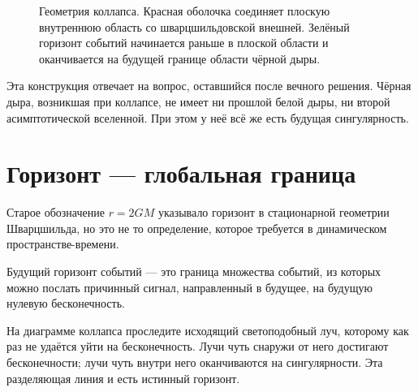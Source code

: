 \begin{figure}[htbp]
\centering
{}
\caption{Геометрия коллапса. Красная оболочка соединяет плоскую внутреннюю область со шварцшильдовской внешней. Зелёный горизонт событий начинается раньше в плоской области и оканчивается на будущей границе области чёрной дыры.}
\label{fig:l05-collapse}
\end{figure}

Эта конструкция отвечает на вопрос, оставшийся после вечного решения. Чёрная дыра, возникшая при коллапсе, не имеет ни прошлой белой дыры, ни второй асимптотической вселенной. При этом у неё всё же есть будущая сингулярность.

\section{Горизонт — глобальная граница}

Старое обозначение \(r=2GM\) указывало горизонт в стационарной геометрии Шварцшильда, но это не то определение, которое требуется в динамическом пространстве-времени.

\begin{definition}
Будущий горизонт событий — это граница множества событий, из которых можно послать причинный сигнал, направленный в будущее, на будущую нулевую бесконечность.
\end{definition}

На диаграмме коллапса проследите исходящий светоподобный луч, которому как раз не удаётся уйти на бесконечность. Лучи чуть снаружи от него достигают бесконечности; лучи чуть внутри него оканчиваются на сингулярности. Эта разделяющая линия и есть истинный горизонт.

